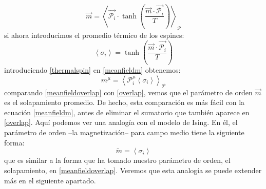 \documentclass[titlepage,12pt]{article}
\numberwithin{equation}{section}
\begin{document}
	\begin{equation}
	\vec{m}=\left<\vec{\mathcal{P}_i}\cdot\tanh\left(\frac{\vec{m}\cdot\vec{\mathcal{P}_i}}{T}\right)\right>_{\mathcal{P}}
	\label{meanfieldm}
	\end{equation}
	si ahora introducimos el promedio térmico de los espines:
	\begin{equation}
	\left<\sigma_i\right>=\tanh\left(\frac{\vec{m}\cdot\vec{\mathcal{P}_i}}{T}\right)
	\label{thermalspin}
	\end{equation}
	introduciendo \eqref{thermalspin} en \eqref{meanfieldm} obtenemos:
	\begin{equation}
	m^\mu=\left<\mathcal{P}^\mu_i{\left<\sigma_i\right>}\right>_{\mathcal{P}}
	\label{meanfieldoverlap}
	\end{equation}
	comparando \eqref{meanfieldoverlap} con \eqref{overlap}, vemos que el parámetro de orden $\vec{m}$ es el solapamiento promedio. De hecho, esta comparación es más fácil con la ecuación \eqref{meanfieldm}, antes de eliminar el sumatorio que también aparece en \eqref{overlap}. Aquí podemos ver una analogía con el modelo de Ising. En él, el parámetro de orden --la magnetización-- para campo medio tiene la siguiente forma:
	\begin{displaymath}
	\tilde{m}=\left<\sigma_i\right>
	\end{displaymath}
	que es similar a la forma que ha tomado nuestro parámetro de orden, el solapamiento, en \eqref{meanfieldoverlap}. Veremos que esta analogía se puede extender más en el siguiente apartado.
\end{document}
